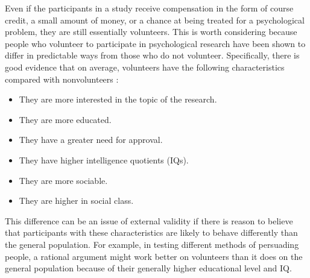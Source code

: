 \color{fgcolor}\begin{kframe}


Even if the participants in a study receive compensation in the form of course credit, a small amount of money, or a chance at being treated for a psychological problem, they are still essentially volunteers. This is worth considering because people who volunteer to participate in psychological research have been shown to differ in predictable ways from those who do not volunteer. Specifically, there is good evidence that on average, volunteers have the following characteristics compared with nonvolunteers \citep{rosenthal_volunteer_1975}:


\begin{itemize}
\item They are more interested in the topic of the research.
\item They are more educated.
\item They have a greater need for approval.
\item They have higher intelligence quotients (IQs).
\item They are more sociable.
\item They are higher in social class.
\end{itemize}

This difference can be an issue of external validity if there is reason to believe that participants with these characteristics are likely to behave differently than the general population. For example, in testing different methods of persuading people, a rational argument might work better on volunteers than it does on the general population because of their generally higher educational level and IQ.

\end{kframe}

